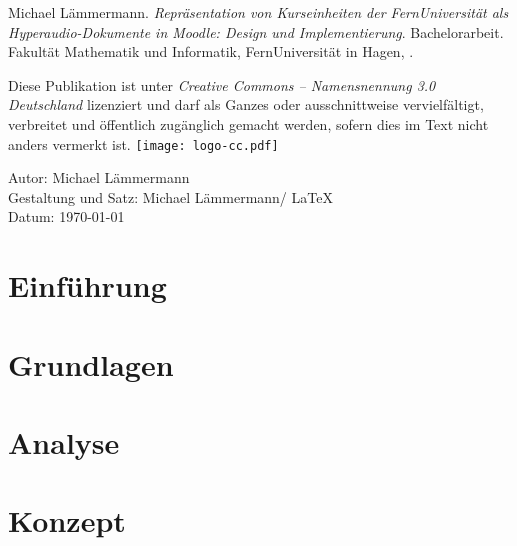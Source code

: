 \documentclass[twoside,bibliography=totoc,openany,numbers=noenddot]{fumi}
\newcommand{\thesistitle}{Repräsentation von Kurseinheiten der FernUniversität als Hyperaudio-Dokumente in Moodle: Design und Implementierung}
\newcommand{\thesisauthor}{Michael Lämmermann}
\newcommand{\thesistype}{Bachelorarbeit} %
\begin{document}
{\small

\thesisauthor. \textit{\thesistitle}. \thesistype. Fakultät Mathematik und Informatik, FernUniversität in Hagen, \the\year. %
\\\vfill

Diese Publikation ist unter \emph{Creative Commons -- Namensnennung 3.0 Deutschland} lizenziert und darf als Ganzes oder ausschnittweise vervielfältigt, verbreitet und öffentlich zugänglich gemacht werden, sofern dies im Text nicht anders vermerkt ist.\newline\vspace{10pt}
\hspace{-9pt}\texttt{[image: logo-cc.pdf]}
\\\vspace{10pt}

Autor: \thesisauthor\\
Gestaltung und Satz: \thesisauthor / \LaTeX\\
Datum: \today\\
\cleardoublepage
}

\pagestyle{headings}
\tableofcontents


\chapter{Einführung}



\chapter{Grundlagen}



\chapter{Analyse}



\chapter{Konzept}

\end{document}
